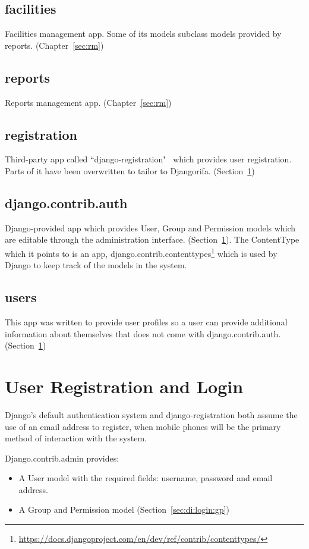 \subsection{facilities}
Facilities management app. Some of its models subclass models provided by reports. (Chapter~\ref{sec:rm})

\subsection{reports}
Reports management app. (Chapter~\ref{sec:rm})

\subsection{registration}
Third-party app called ``django-registration"~\cite{registration} which provides user registration. Parts of it have been overwritten to tailor to Djangorifa. (Section~\ref{sec:di:login})

\subsection{django.contrib.auth}
Django-provided app which provides User, Group and Permission models which are editable through the administration interface. (Section~\ref{sec:di:login}). The ContentType which it points to is an app, django.contrib.contenttypes\footnote{ \url{https://docs.djangoproject.com/en/dev/ref/contrib/contenttypes/}} which is used by Django to keep track of the models in the system.

\subsection{users}
This app was written to provide user profiles so a user can provide additional information about themselves that does not come with django.contrib.auth. (Section~\ref{sec:di:login})

\section{User Registration and Login}
\label{sec:di:login}

Django's default authentication system and django-registration both assume the use of an email address to register, when mobile phones will be the primary method of interaction with the system.

Django.contrib.admin provides:
\begin{itemize}
\item A User model with the required fields: username, password and email address.
\item A Group and Permission model (Section~\ref{sec:di:login:gp})
\end{itemize}

